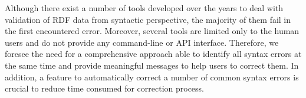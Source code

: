 Although there exist a number of tools developed over the years to deal with validation of RDF data from syntactic perspective, the majority of them fail in the first encountered error.
Moreover, several tools are limited only to the human users and do not provide any command-line or API interface.
Therefore, we foresee the need for a comprehensive approach able to identify all syntax errors at the same time and provide meaningful messages to help users to correct them.
In addition, a feature to automatically correct a number of common syntax errors is crucial to reduce time consumed for correction process.  











